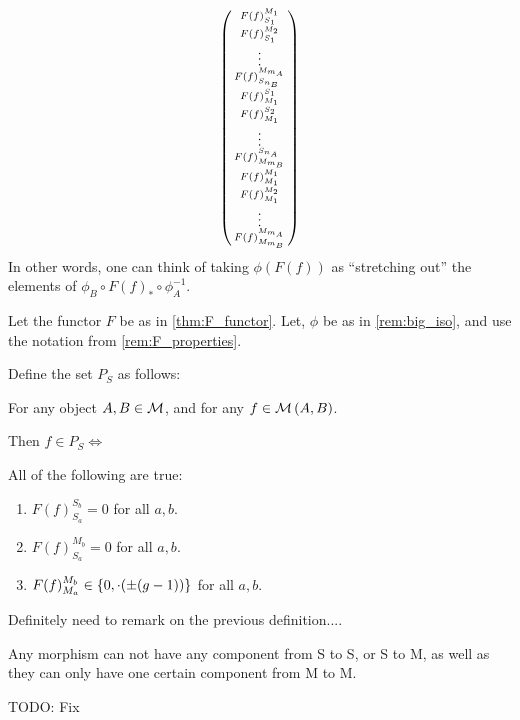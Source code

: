 \begin{remark}
\[\begin{psmallmatrix}
            F(f)_{S_1}^{M_1} \\
            F(f)_{S_1}^{M_2} \\
            \vdots \\
            F(f)_{S_{n_B}}^{M_{m_A}} \\
            F(f)_{M_1}^{S_1} \\
            F(f)_{M_1}^{S_2} \\
            \vdots \\
            F(f)_{M_{m_B}}^{S_{n_A}} \\
            F(f)_{M_1}^{M_1} \\
            F(f)_{M_1}^{M_2} \\
            \vdots \\
            F(f)_{M_{m_B}}^{M_{m_A}}
        \end{psmallmatrix}
    \]
    In other words, one can think of taking \( \phi(F(f)) \) as ``stretching out'' the elements of \( \phi_B \circ F(f)_* \circ \phi_A^{-1} \).
\end{remark}

\begin{definition} \label{def:unholy}
    Let the functor \( F \) be as in \autoref{thm:F_functor}.  Let, \( \phi \) be as in \autoref{rem:big_iso}, and use the notation from \autoref{rem:F_properties}.

    Define the set \( P_S \) as follows:

    For any object \( A, B \in {\mathcal{M}} \), and for any \( f \in {\mathcal{M}}\left( A, B \right) \).

    Then \( f \in P_S \iff \)

    All of the following are true:
    \begin{enumerate}
        \item \( F(f)_{S_a}^{S_b} = 0 \) for all \( a, b \).
        \item \( F(f)_{S_a}^{M_b} = 0 \) for all  \( a, b \).
        \item \( F(f)_{M_a}^{M_b} \in \left\{ 0, \cdot(\pm (g - 1)) \right\} \) for all \( a, b \).
    \end{enumerate}
\end{definition}

\begin{remark}
    Definitely need to remark on the previous definition.... 
    
    Any morphism can not have any component from S to S, or S to M, as well as they can only have one certain component from M to M.

    TODO: Fix
\end{remark}

